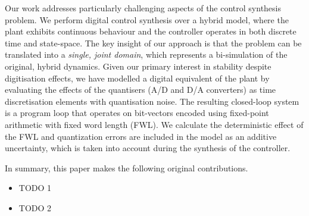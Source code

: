 \documentclass{sig-alternate-05-2015}
\begin{document}
Our work addresses particularly challenging aspects of the control synthesis
problem.  We perform digital control synthesis over a hybrid model, where
the plant exhibits continuous behaviour and the controller operates in both
discrete time and state-space.  The key insight of our approach is that the
problem can be translated into a \emph{single, joint domain}, which
represents a bi-simulation of the original, hybrid dynamics.  Given our
primary interest in stability despite digitisation effects, we have modelled
a digital equivalent of the plant by evaluating the effects of the
quantisers (A/D and D/A converters) as time discretisation elements with
quantisation noise.  The resulting closed-loop system is a program loop that
operates on bit-vectors encoded using fixed-point arithmetic with fixed word
length (FWL).  We calculate the deterministic effect of the FWL and
quantization errors are included in the model as an additive uncertainty,
which is taken into account during the synthesis of the controller.

In summary, this paper makes the following original contributions.
%
\begin{itemize}

\item TODO 1

\item TODO 2

\end{itemize}




\end{document}
